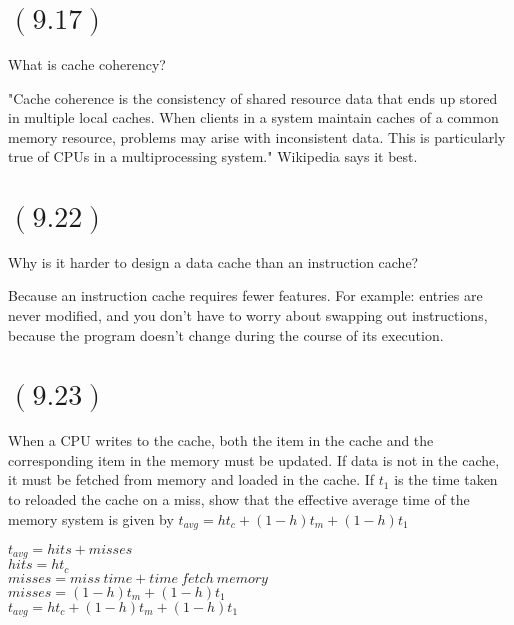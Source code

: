 \documentclass[letterpaper,12pt,titlepage]{article}
\begin{document}
\section*{$(9.17)$} What is cache coherency?
\begin{mdframed}[style=MyFrame]
"Cache coherence is the consistency of shared resource data that ends up stored in multiple local caches. When clients in a system maintain caches of a common memory resource, problems may arise with inconsistent data. This is particularly true of CPUs in a multiprocessing system." Wikipedia says it best. 
\end{mdframed}

\section*{$(9.22)$} Why is it harder to design a data cache than an instruction cache?

\begin{mdframed}[style=MyFrame]
Because an instruction cache requires fewer features. For example: entries are never modified, and you don't have to worry about swapping out instructions, because the program doesn't change during the course of its execution.
\end{mdframed}

\section*{$(9.23)$} When a CPU  writes to the cache, both the item in the cache and the corresponding item in the memory must be updated. If data is not in the cache, it must be fetched from memory and loaded in the cache. If $t_1$ is the time taken to reloaded the cache on a miss, show that the effective average time of the memory system is given by $t_{avg}=ht_c+(1-h)t_m+(1-h)t_1$

\begin{mdframed}[style=MyFrame]
 $t_{avg}=hits+misses$\\
 $hits=ht_c$\\
 $misses=miss~time+time~fetch~memory$\\
 $misses=(1-h)t_m+(1-h)t_1$\\
 $t_{avg}=ht_c+(1-h)t_m+(1-h)t_1$
\end{mdframed}

\newpage
\end{document}

